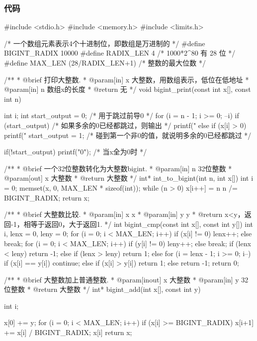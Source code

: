 \subsubsection{代码}
\begin{Codex}[label=wikioi1166_matrix_game.c]
#include <stdio.h>
#include <memory.h>
#include <limits.h>

/* 一个数组元素表示4个十进制位，即数组是万进制的 */
#define BIGINT_RADIX 10000
#define RADIX_LEN 4
/* 1000*2^80 有 28 位 */
#define MAX_LEN (28/RADIX_LEN+1)  /* 整数的最大位数 */

/**
 * @brief 打印大整数.
 * @param[in] x 大整数，用数组表示，低位在低地址
 * @param[in] n 数组x的长度
 * @return 无
 */
void bigint_print(const int x[], const int n) {
    int i;
    int start_output = 0;  /* 用于跳过前导0 */
    for (i = n - 1; i >= 0; --i) {
        if (start_output) {  /* 如果多余的0已经都跳过，则输出 */
            printf("%
        } else if (x[i] > 0) {
            printf("%
            start_output = 1; /* 碰到第一个非0的值，就说明多余的0已经都跳过 */
        }
    }

    if(!start_output) printf("0");  /* 当x全为0时 */
}

/**
 * @brief 一个32位整数转化为大整数bigint.
 * @param[in] n 32位整数
 * @param[out] x 大整数
 * @return 大整数
 */
int* int_to_bigint(int n, int x[]) {
    int i = 0;
    memset(x, 0, MAX_LEN * sizeof(int));
    while (n > 0) {
        x[i++] = n %
        n /= BIGINT_RADIX;
    }
    return x;
}


/**
 * @brief 大整数比较.
 * @param[in] x x
 * @param[in] y y
 * @return x<y，返回-1，相等于返回0，大于返回1.
 */
int bigint_cmp(const int x[], const int y[]) {
    int i, lenx = 0, leny = 0;
    for (i = 0; i < MAX_LEN; i++) {
        if (x[i] != 0) lenx++;
        else break;
    }
    for (i = 0; i < MAX_LEN; i++) {
        if (y[i] != 0) leny++;
        else break;
    }
    if (lenx < leny) return -1;
    else if (lenx > leny) return 1;
    else {
        for (i = lenx - 1; i >= 0; i--) {
            if (x[i] == y[i]) continue;
            else if (x[i] > y[i]) return 1;
            else return -1;
        }
        return 0;
    }
}

/**
 * @brief 大整数加上普通整数.
 * @param[inout] x 大整数
 * @param[in] y 32位整数
 * @return 大整数
 */
int* bigint_add(int x[], const int y) {
    int i;

    x[0] += y;
    for (i = 0; i < MAX_LEN; i++) {
        if (x[i] >= BIGINT_RADIX) {
            x[i+1] += x[i] / BIGINT_RADIX;
            x[i] %
        }
    }
    return x;
}



\end{Codex}
